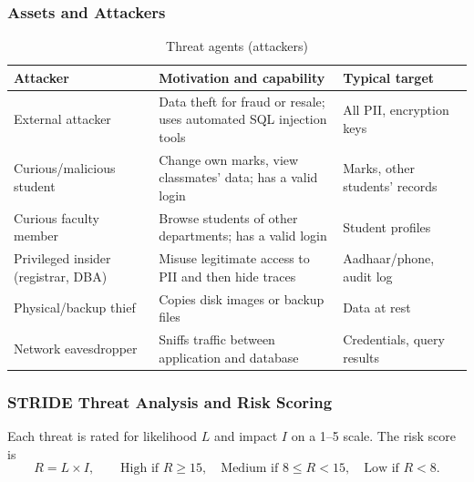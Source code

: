 \documentclass[11pt,a4paper]{report}
\begin{document}
\subsubsection{Assets and Attackers}
\begin{table}[H]
    \centering
    \caption{Threat agents (attackers)}
    \small
    \begin{tabularx}{\textwidth}{|>{\raggedright\arraybackslash}p{3.7cm}|Y|>{\raggedright\arraybackslash}p{3.6cm}|}
        \hline
        \textbf{Attacker} & \textbf{Motivation and capability} & \textbf{Typical target} \\ \hline
        External attacker & Data theft for fraud or resale; uses automated SQL injection tools & All PII, encryption keys \\ \hline
        Curious/malicious student & Change own marks, view classmates' data; has a valid login & Marks, other students' records \\ \hline
        Curious faculty member & Browse students of other departments; has a valid login & Student profiles \\ \hline
        Privileged insider (registrar, DBA) & Misuse legitimate access to PII and then hide traces & Aadhaar/phone, audit log \\ \hline
        Physical/backup thief & Copies disk images or backup files & Data at rest \\ \hline
        Network eavesdropper & Sniffs traffic between application and database & Credentials, query results \\ \hline
    \end{tabularx}
\end{table}

\subsubsection{STRIDE Threat Analysis and Risk Scoring}
Each threat is rated for likelihood $L$ and impact $I$ on a 1--5 scale. The risk score is
$$R = L \times I, \qquad \text{High if } R \ge 15,\quad \text{Medium if } 8 \le R < 15,\quad \text{Low if } R < 8.$$
\end{document}
